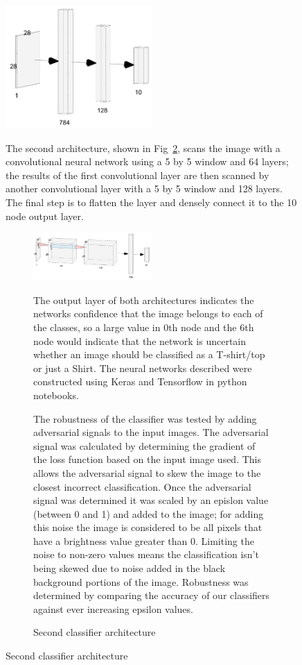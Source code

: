 \documentclass[conference]{IEEEtran}
\begin{document}
    \begin{figure}[!h]
    \begin{center}
    \caption{First classifier architecture}
    \includegraphics[width=0.5\textwidth]{First_Classifier_Architecture.png}
    \label{figclass1}
    \end{center}
The second architecture, shown in Fig~\ref{figclass2}, scans the image with a convolutional neural network using a 5 by 5 window and 64 layers; the results of the first convolutional layer are then scanned by another convolutional layer with a 5 by 5 window and 128 layers. The final step is to flatten the layer and densely connect it to the 10 node output layer.
    \begin{figure}[!h]
    \begin{center}
    \caption{Second classifier architecture}
    \includegraphics[width=0.5\textwidth]{Second_Classifier_Architecture.png}
    \label{figclass2}
    \end{center}
The output layer of both architectures indicates the networks confidence that the image belongs to each of the classes, so a large value in 0th node and the 6th node would indicate that the network is uncertain whether an image should be classified as a T-shirt/top or just a Shirt. The neural networks described were constructed using Keras and Tensorflow in python notebooks.

    The robustness of the classifier was tested by adding adversarial signals to the input images. The adversarial signal was calculated by determining the gradient of the loss function based on the input image used. This allows the adversarial signal to skew the image to the closest incorrect classification. Once the adversarial signal was determined it was scaled by an epislon value (between 0 and 1) and added to the image; for adding this noise the image is considered to be all pixels that have a brightness value greater than 0. Limiting the noise to non-zero values means the classification isn't being skewed due to noise added in the black background portions of the image. Robustness was determined by comparing the accuracy of our classifiers against ever increasing epsilon values.


\end{figure}
\end{figure}
\end{document}
